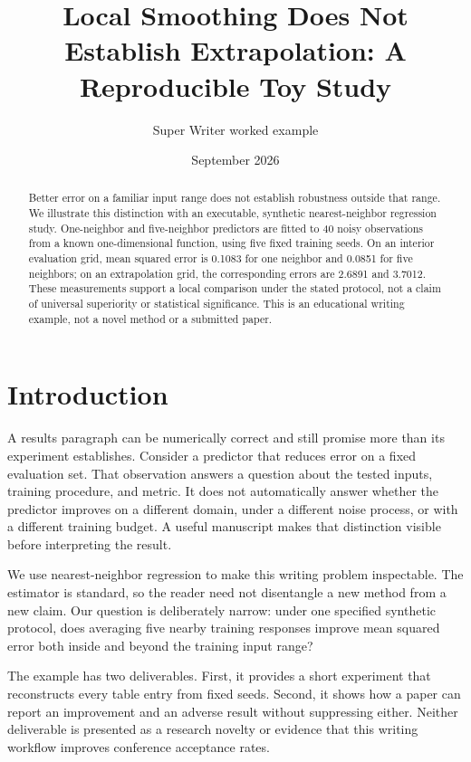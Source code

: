 \documentclass[
  10pt,
  letterpaper,
]{article}
\title{Local Smoothing Does Not Establish Extrapolation: A Reproducible
Toy Study}
\author{Super Writer worked example}
\date{September 2026}
\begin{document}
\maketitle
\begin{abstract}
Better error on a familiar input range does not establish robustness
outside that range. We illustrate this distinction with an executable,
synthetic nearest-neighbor regression study. One-neighbor and
five-neighbor predictors are fitted to 40 noisy observations from a
known one-dimensional function, using five fixed training seeds. On an
interior evaluation grid, mean squared error is 0.1083 for one neighbor
and 0.0851 for five neighbors; on an extrapolation grid, the
corresponding errors are 2.6891 and 3.7012. These measurements support a
local comparison under the stated protocol, not a claim of universal
superiority or statistical significance. This is an educational writing
example, not a novel method or a submitted paper.
\end{abstract}

\section{Introduction}\label{introduction}

A results paragraph can be numerically correct and still promise more
than its experiment establishes. Consider a predictor that reduces error
on a fixed evaluation set. That observation answers a question about the
tested inputs, training procedure, and metric. It does not automatically
answer whether the predictor improves on a different domain, under a
different noise process, or with a different training budget. A useful
manuscript makes that distinction visible before interpreting the
result.

We use nearest-neighbor regression to make this writing problem
inspectable. The estimator is standard, so the reader need not
disentangle a new method from a new claim. Our question is deliberately
narrow: under one specified synthetic protocol, does averaging five
nearby training responses improve mean squared error both inside and
beyond the training input range?

The example has two deliverables. First, it provides a short experiment
that reconstructs every table entry from fixed seeds. Second, it shows
how a paper can report an improvement and an adverse result without
suppressing either. Neither deliverable is presented as a research
novelty or evidence that this writing workflow improves conference
acceptance rates.
\end{document}

